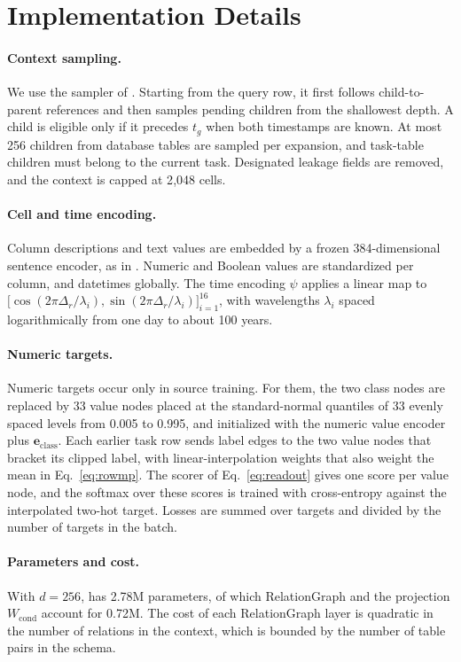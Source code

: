 \section{Implementation Details}
\label{app:details}

\paragraph{Context sampling.}
We use the sampler of \RT{} \citep[Section~3.1 and Appendix~A]{ranjan2026rt}.
Starting from the query row, it first follows child-to-parent references and
then samples pending children from the shallowest depth. A child is eligible
only if it precedes $t_g$ when both timestamps are known. At most 256
children from database tables are sampled per expansion, and task-table
children must belong to the current task. Designated leakage fields are
removed, and the context is capped at 2{,}048 cells.

\paragraph{Cell and time encoding.}
Column descriptions and text values are embedded by a frozen 384-dimensional
sentence encoder, as in \RT{}. Numeric and Boolean values are standardized per
column, and datetimes globally. The time encoding $\psi$ applies a linear map
to $\big[\cos(2\pi\Delta_r/\lambda_i),\sin(2\pi\Delta_r/\lambda_i)\big]_{i=1}^{16}$,
with wavelengths $\lambda_i$ spaced logarithmically from one day to about
100 years.

\paragraph{Numeric targets.}
Numeric targets occur only in source training. For them, the two class nodes
are replaced by 33 value nodes placed at the standard-normal quantiles of 33
evenly spaced levels from 0.005 to 0.995, and initialized with the numeric
value encoder plus $\mathbf e_{\mathrm{class}}$. Each earlier task row sends
label edges to the two value nodes that bracket its clipped label, with
linear-interpolation weights that also weight the mean in
Eq.~\eqref{eq:rowmp}. The scorer of Eq.~\eqref{eq:readout} gives one score per
value node, and the softmax over these scores is trained with cross-entropy
against the interpolated two-hot target. Losses are summed over targets and
divided by the number of targets in the batch.

\paragraph{Parameters and cost.}
With $d=256$, \model{} has 2.78M parameters, of which RelationGraph and the
projection $W_{\mathrm{cond}}$ account for 0.72M. The cost of each RelationGraph
layer is quadratic in the number of relations in the context, which is
bounded by the number of table pairs in the schema.
